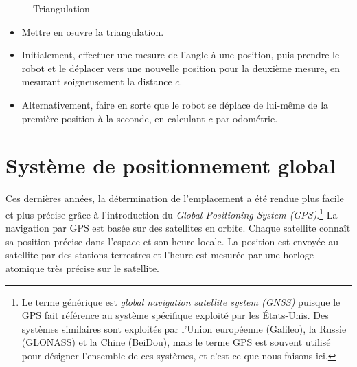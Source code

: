 \begin{figure}
\begin{center}
\caption{Triangulation}\label{fig.triangulation}
\end{center}
\end{figure}

\begin{framed}
\begin{itemize}
\item Mettre en œuvre la triangulation.
\item Initialement, effectuer une mesure de l'angle à une position, puis prendre le robot et le déplacer vers une nouvelle position pour la deuxième mesure, en mesurant soigneusement la distance $c$.
\item Alternativement, faire en sorte que le robot se déplace de lui-même de la première position à la seconde, en calculant $c$ par odométrie.
\end{itemize}
\end{framed}

\section{Système de positionnement global}\label{s.gps}

Ces dernières années, la détermination de l'emplacement a été rendue plus facile et plus précise grâce à l'introduction du \emph{Global Positioning System (GPS)}.\footnote{Le terme générique est \emph{global navigation satellite system (GNSS)} puisque le GPS fait référence au système spécifique exploité par les États-Unis. Des systèmes similaires sont exploités par l'Union européenne (Galileo), la Russie (GLONASS) et la Chine (BeiDou), mais le terme GPS est souvent utilisé pour désigner l'ensemble de ces systèmes, et c'est ce que nous faisons ici.} La navigation par GPS est basée sur des satellites en orbite. Chaque satellite connaît sa position précise dans l'espace et son heure locale. La position est envoyée au satellite par des stations terrestres et l'heure est mesurée par une horloge atomique très précise sur le satellite.

